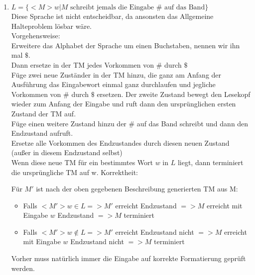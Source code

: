 \documentclass[a4paper,11pt]{scrartcl}
\begin{document}
\begin{enumerate}[label=\alph*)]
	\item	$L = \{<M>w \vert M \text{ schreibt jemals die Eingabe } \# \text{ auf das Band}\}$\\
			Diese Sprache ist nicht entscheidbar, da ansonsten das Allgemeine Halteproblem lösbar wäre.\\
			Vorgehensweise:\\
			Erweitere das Alphabet der Sprache um einen Buchstaben, nennen wir ihn mal $\$$.\\
			Dann ersetze in der TM jedes Vorkommen von $\#$ durch $\$$\\
			Füge zwei neue Zuständer in der TM hinzu, die ganz am Anfang der Ausführung das Eingabewort einmal ganz durchlaufen und jegliche Vorkommen von $\#$ durch $\$$ ersetzen. Der zweite Zustand bewegt den Lesekopf wieder zum Anfang der Eingabe und ruft dann den ursprünglichen ersten Zustand der TM auf.\\
			Füge einen weitere Zustand hinzu der $\#$ auf das Band schreibt und dann den Endzustand aufruft.\\
			Ersetze alle Vorkommen des Endzustandes durch diesen neuen Zustand (außer in diesem Endzustand selbst)\\
			Wenn diese neue TM für ein bestimmtes Wort $w$ in $L$ liegt, dann terminiert die ursprüngliche TM auf w.
			Korrektheit:
			\begin{center}
			Für $M'$ ist nach der oben gegebenen Beschreibung generierten TM aus M:
			\end{center}
			\begin{itemize}
			\item Falls $<M'>w \in L => M'$ erreicht Endzustand $=> M$ erreicht mit Eingabe $w$ Endzustand $=> M$ terminiert
			\item Falls $<M'>w \not\in L => M'$ erreicht Endzustand nicht $=> M$ erreicht mit Eingabe $w$ Endzustand nicht $=> M$ terminiert
			\end{itemize}
			Vorher muss natürlich immer die Eingabe auf korrekte Formatierung geprüft werden.	
		

\end{enumerate}
\end{document}
